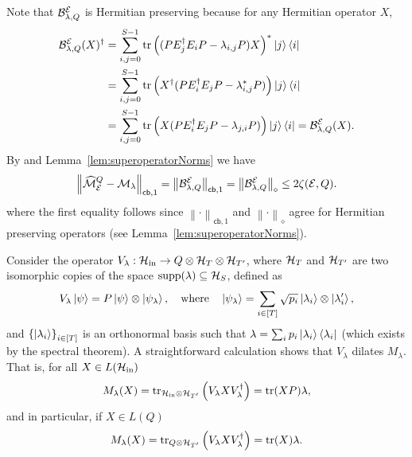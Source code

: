 \documentclass[10pt]{article}
\DeclareMathOperator{\supp}{supp}
\newcommand{\SIN}{\mathrm{in}}
\newcommand{\tr}{\mathrm{tr}}
\newcommand{\p}[1]{\left(#1\right)}
\newcommand{\ppp}[1]{\left\{#1\right\}}
\newcommand{\norm}[1]{\left\|#1\right\|}
\newcommand{\s}[1]{\mathsf{#1}}
\begin{document}
Note that ${\cal B}_{\lambda,Q}^{\cal E}$ is Hermitian preserving because for any Hermitian operator $X$,
\begin{align}
        \nonumber\calB_{\lambda,Q}^{\calE}(X)^\dag&= \sum_{i,j=0}^{S-1}\tr\p{(PE_j^\dag E_iP -\lambda_{i,j}P)X}^*\ket{j}\bra{i}
        \\\nonumber&=\sum_{i,j=0}^{S-1}\tr\p{X^\dag(PE_i^\dag E_jP -\lambda_{i,j}^*P)}\ket{j}\bra{i}\\
        &=\sum_{i,j=0}^{S-1}\tr\p{X(PE_i^\dag E_jP -\lambda_{j,i}P)}\ket{j}\bra{i}= \calB_{\lambda,Q}^{\calE}(X).\label{eq:HermitianPereserving}
    \end{align}
By \cite[Remark 8]{Elimelech2026Theory} and Lemma~\ref{lem:superoperatorNorms}  we have 
\begin{equation}
\norm{\widehat{\calM}^Q_{\calE}-\calM_{\lambda}}_{\s{cb},1}=\norm{\calB_{\lambda,Q}^{\calE}}_{\s{cb},1}=\norm{\calB_{\lambda,Q}^{\calE}}_{\diamond}\leq 2\zeta(\calE,Q).\label{eq:BOoperatorBoundByzeta}
\end{equation}
where the first equality follows since $\norm{\cdot}_{\s{cb},1}$ and $\norm{\cdot}_{\diamond}$ agree for Hermitian preserving operators (see Lemma~\ref{lem:superoperatorNorms}).

Consider the operator $V_{\lambda}:\calH_{\SIN}\to Q \otimes \calH_T\otimes \calH_{T'}$, where ${\cal H}_T$ and ${\cal H}_{T'}$ are two isomorphic copies of the space $\supp(\lambda)\subseteq \calH_S$, defined as 
\begin{equation}
    V_{\lambda}\ket{\psi}=P\ket{\psi}\otimes \ket{\psi_\lambda},\quad \text{where} \quad \ket{\psi_{\lambda}}=\sum_{i\in [T]} \sqrt{p_i}\ket{\lambda_i}\otimes\ket{\lambda'_{i}},\label{eq:VlambdaDef}
\end{equation}
and $\ppp{\ket{\lambda_i}}_{i\in[T]}$ is an orthonormal basis such that $\lambda=\sum_i p_i \ket{\lambda_i}\bra{\lambda_i}$ (which exists by the spectral theorem).
A straightforward calculation shows that $V_{\lambda}$ dilates $M_{\lambda}$. That is, for all $X\in L(\calH_{\SIN})$
\[M_{\lambda}(X)=\tr_{\calH_{\SIN}\otimes \calH_{T'}}\p{V_{\lambda} X V_{\lambda}^\dag}=\tr(XP)\lambda,\]
and in particular, if $X\in L(Q)$
\[M_{\lambda}(X)=\tr_{Q\otimes \calH_{T'}}\p{V_{\lambda} X V_{\lambda}^\dag}=\tr(X)\lambda.
\]
\end{document}
